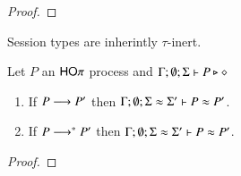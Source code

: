 \begin{proof}
\end{proof}

Session types are inherintly $\tau$-inert.

\begin{lemma}\rm
	\label{lem:tau_inert}
	Let $P$ an $\mathsf{HO}\pi$ process
	and $\Gamma; \emptyset; \Sigma \vdash P \triangleright \diamond$
	\begin{enumerate}
		\item	If $P \longrightarrow P'$ then $\Gamma; \emptyset; \Sigma \approx \Sigma' \vdash P \approx P'$.
		\item	If $P \longrightarrow^* P'$ then $\Gamma; \emptyset; \Sigma \approx \Sigma' \vdash P \approx P'$.
	\end{enumerate}
\end{lemma}

\begin{proof}
\end{proof}


